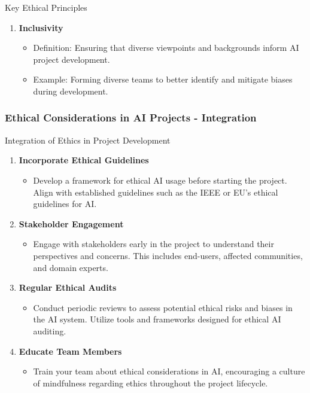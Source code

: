 \documentclass{beamer}
\begin{document}
\begin{frame}[fragile]
\begin{block}{Key Ethical Principles}
\begin{enumerate}
            \item \textbf{Inclusivity}
                \begin{itemize}
                    \item Definition: Ensuring that diverse viewpoints and backgrounds inform AI project development.
                    \item Example: Forming diverse teams to better identify and mitigate biases during development.
                \end{itemize}
        \end{enumerate}
    \end{block}
\end{frame}

\begin{frame}[fragile]
    \frametitle{Ethical Considerations in AI Projects - Integration}
    \begin{block}{Integration of Ethics in Project Development}
        \begin{enumerate}
            \item \textbf{Incorporate Ethical Guidelines}
                \begin{itemize}
                    \item Develop a framework for ethical AI usage before starting the project. Align with established guidelines such as the IEEE or EU's ethical guidelines for AI.
                \end{itemize}
                
            \item \textbf{Stakeholder Engagement}
                \begin{itemize}
                    \item Engage with stakeholders early in the project to understand their perspectives and concerns. This includes end-users, affected communities, and domain experts.
                \end{itemize}
                
            \item \textbf{Regular Ethical Audits}
                \begin{itemize}
                    \item Conduct periodic reviews to assess potential ethical risks and biases in the AI system. Utilize tools and frameworks designed for ethical AI auditing.
                \end{itemize}
                
            \item \textbf{Educate Team Members}
                \begin{itemize}
                    \item Train your team about ethical considerations in AI, encouraging a culture of mindfulness regarding ethics throughout the project lifecycle.
                \end{itemize}
                

\end{enumerate}
\end{block}
\end{frame}
\end{document}
